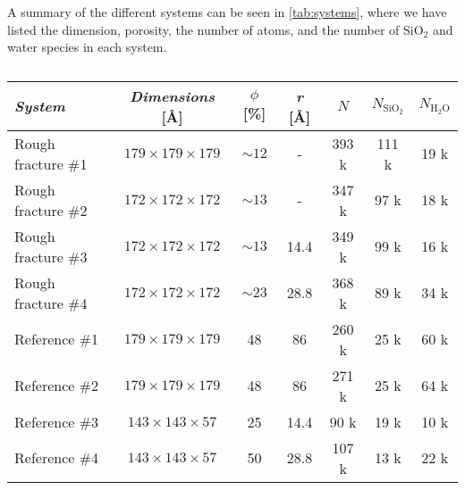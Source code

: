 A summary of the different systems can be seen in \cref{tab:systems}, where we have listed the dimension, porosity, the number of atoms, and the number of SiO$_2$ and water species in each system.
%
\begin{table}[htpb]
\centering
    \begin{tabular}{l|cccccc}
    \textit{System}             & \textit{Dimensions} [\AA]     & $\phi$ [\%]   & \textit{r} [\AA]  & $N$       & $N_\text{SiO$_2$}$    & $N_\text{H$_2$O}$ \\ \hline 
    Rough fracture \#1          & $179 \times 179 \times 179$   & ${\sim}12$    & -                 & 393 k  & 111 k                    & 19 k           \\ %
    Rough fracture \#2          & $172 \times 172 \times 172$   & ${\sim}13$    & -                 & 347 k  & 97 k                     & 18 k            \\ %
    Rough fracture \#3          & $172 \times 172 \times 172$   & ${\sim}13$    & 14.4              & 349 k  & 99 k                     & 16 k            \\ %
    Rough fracture \#4          & $172 \times 172 \times 172$   & ${\sim}23$    & 28.8              & 368 k  & 89 k                     & 34 k            \\ %
    \hline %
    Reference \#1           & $179 \times 179 \times 179$   & 48            & 86                & 260 k     & 25 k                  & 60 k                             \\ %
    Reference \#2           & $179 \times 179 \times 179$   & 48            & 86                & 271 k     & 25 k                  & 64 k                             \\ %
    Reference \#3           & $143 \times 143 \times 57$    & 25            & 14.4              & 90 k      & 19 k                  & 10 k                             \\ %
    Reference \#4           & $143 \times 143 \times 57$    & 50            & 28.8              & 107 k     & 13 k                  & 22 k                             \\ %
    \end{tabular}%
    \vspace{8pt}
    \caption{%
}
\end{table}
